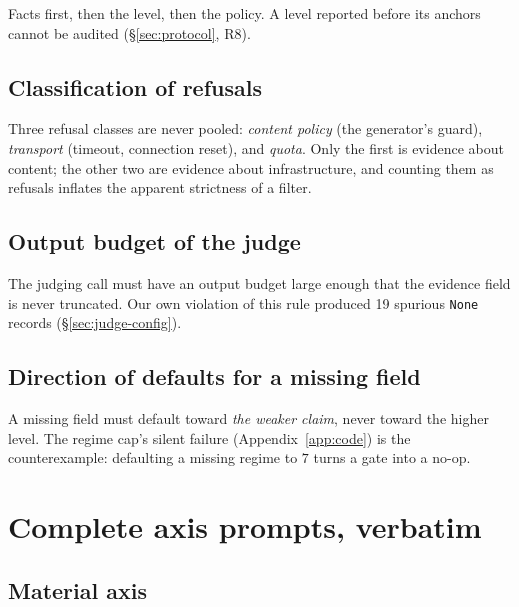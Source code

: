 Facts first, then the level, then the policy. A level reported before its
anchors cannot be audited (\S\ref{sec:protocol}, R8).

\subsection{Classification of refusals}

Three refusal classes are never pooled: \emph{content policy} (the generator's
guard), \emph{transport} (timeout, connection reset), and \emph{quota}. Only
the first is evidence about content; the other two are evidence about
infrastructure, and counting them as refusals inflates the apparent strictness
of a filter.

\subsection{Output budget of the judge}

The judging call must have an output budget large enough that the evidence
field is never truncated. Our own violation of this rule produced 19 spurious
\texttt{None} records (\S\ref{sec:judge-config}).

\subsection{Direction of defaults for a missing field}

A missing field must default toward \emph{the weaker claim}, never toward the
higher level. The regime cap's silent failure
(Appendix~\ref{app:code}) is the counterexample: defaulting a missing regime to
$7$ turns a gate into a no-op.

\section{Complete axis prompts, verbatim}
\label{app:axisprompts}

\subsection{Material axis}

